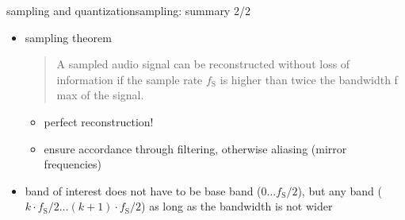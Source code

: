 		\begin{frame}{sampling and quantization}{sampling: summary 2/2}
			\begin{itemize}
				\item   sampling theorem
                    \begin{quote}
                        A sampled audio signal can be reconstructed without loss of information if the sample rate $f_\mathrm{S}$ is higher than twice the bandwidth f max of the signal.
                    \end{quote}
                    \begin{itemize}
                        \item   perfect reconstruction!
                        \item   ensure accordance through filtering, otherwise aliasing (mirror frequencies)
                    \end{itemize}
                \item   band of interest does not have to be base band ($0\ldots f_\mathrm{S}/2$), but any band ($k\cdot f_\mathrm{S}/2\ldots(k+1)\cdot f_\mathrm{S}/2$) as long as the bandwidth is not wider 
			\end{itemize}
		\end{frame}



